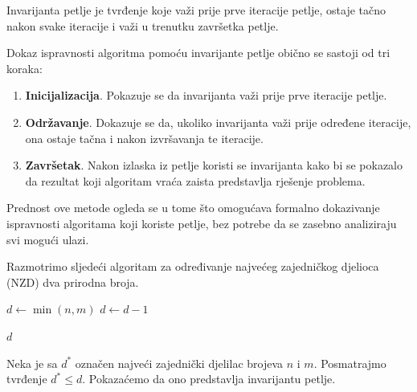 \begin{definition}
	Invarijanta petlje je tvrđenje koje važi prije prve iteracije petlje, ostaje tačno nakon svake iteracije i važi u trenutku završetka petlje.
\end{definition}

Dokaz ispravnosti algoritma pomoću invarijante petlje obično se sastoji od tri koraka:

\begin{enumerate}
	\item \textbf{Inicijalizacija}. Pokazuje se da invarijanta važi prije prve iteracije petlje.
	
	\item \textbf{Održavanje}. Dokazuje se da, ukoliko invarijanta važi prije određene iteracije, ona ostaje tačna i nakon izvršavanja te iteracije.
	
	\item \textbf{Završetak}. Nakon izlaska iz petlje koristi se invarijanta kako bi se pokazalo da rezultat koji algoritam vraća zaista predstavlja rješenje problema.
	
\end{enumerate}

Prednost ove metode ogleda se u tome što omogućava formalno dokazivanje ispravnosti algoritama koji koriste petlje, bez potrebe da se zasebno analiziraju svi mogući ulazi.

\begin{example}
	Razmotrimo sljedeći algoritam za određivanje najvećeg zajedničkog djelioca (NZD) dva prirodna broja.
\end{example}

\begin{algorithm}[H]
	\begin{algorithmic}[1]
		\State $d \gets \min(n,m)$
		\State $d \gets d-1$
		\EndWhile
		
		\State \Return $d$
		\EndProcedure
	\end{algorithmic}
	\caption{Naivni algoritam za određivanje NZD-a.}
	\label{alg:nzd}
	
\end{algorithm}

Neka je sa $d^*$ označen najveći zajednički djelilac brojeva $n$ i $m$. Posmatrajmo tvrđenje $
d^* \leq d.
$  Pokazaćemo da ono predstavlja invarijantu petlje.

